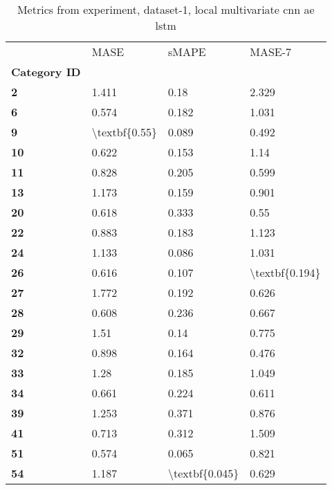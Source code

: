 \begin{table}[h]
\centering
\caption{Metrics from experiment, dataset-1, local multivariate cnn ae lstm}
\label{table:local-multivariate-cnn-ae-lstm-dataset-1}
\begin{tabular}{llll}
\toprule
{} &           MASE &           sMAPE &          MASE-7 \\
\textbf{Category ID} &                &                 &                 \\
\midrule
\textbf{2          } &          1.411 &            0.18 &           2.329 \\
\textbf{6          } &          0.574 &           0.182 &           1.031 \\
\textbf{9          } &  \textbackslash textbf\{0.55\} &           0.089 &           0.492 \\
\textbf{10         } &          0.622 &           0.153 &            1.14 \\
\textbf{11         } &          0.828 &           0.205 &           0.599 \\
\textbf{13         } &          1.173 &           0.159 &           0.901 \\
\textbf{20         } &          0.618 &           0.333 &            0.55 \\
\textbf{22         } &          0.883 &           0.183 &           1.123 \\
\textbf{24         } &          1.133 &           0.086 &           1.031 \\
\textbf{26         } &          0.616 &           0.107 &  \textbackslash textbf\{0.194\} \\
\textbf{27         } &          1.772 &           0.192 &           0.626 \\
\textbf{28         } &          0.608 &           0.236 &           0.667 \\
\textbf{29         } &           1.51 &            0.14 &           0.775 \\
\textbf{32         } &          0.898 &           0.164 &           0.476 \\
\textbf{33         } &           1.28 &           0.185 &           1.049 \\
\textbf{34         } &          0.661 &           0.224 &           0.611 \\
\textbf{39         } &          1.253 &           0.371 &           0.876 \\
\textbf{41         } &          0.713 &           0.312 &           1.509 \\
\textbf{51         } &          0.574 &           0.065 &           0.821 \\
\textbf{54         } &          1.187 &  \textbackslash textbf\{0.045\} &           0.629 \\
\bottomrule
\end{tabular}
\end{table}
